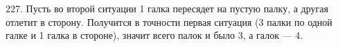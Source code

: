 227. Пусть во второй ситуации 1 галка пересядет на пустую палку, а другая отлетит в сторону. Получится в точности первая ситуация (3 палки по одной галке и 1 галка в стороне), значит всего палок и было 3, а галок --- 4.\\
